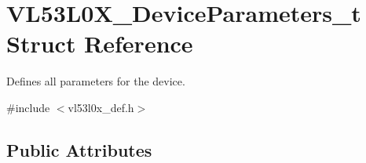 \hypertarget{structVL53L0X__DeviceParameters__t}{}\section{V\+L53\+L0\+X\+\_\+\+Device\+Parameters\+\_\+t Struct Reference}
\label{structVL53L0X__DeviceParameters__t}


Defines all parameters for the device.  




{\ttfamily \#include $<$vl53l0x\+\_\+def.\+h$>$}

\subsection*{Public Attributes}
